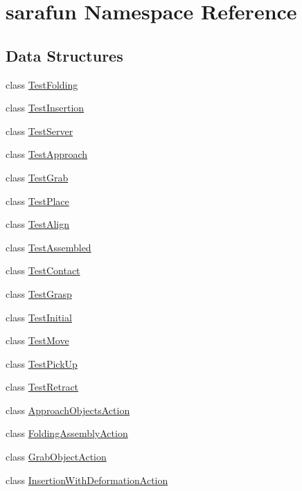 \hypertarget{namespacesarafun}{\section{sarafun Namespace Reference}
\label{namespacesarafun}
}
\subsection*{Data Structures}
\begin{DoxyCompactItemize}
\item 
class \hyperlink{classsarafun_1_1TestFolding}{Test\-Folding}
\item 
class \hyperlink{classsarafun_1_1TestInsertion}{Test\-Insertion}
\item 
class \hyperlink{classsarafun_1_1TestServer}{Test\-Server}
\item 
class \hyperlink{classsarafun_1_1TestApproach}{Test\-Approach}
\item 
class \hyperlink{classsarafun_1_1TestGrab}{Test\-Grab}
\item 
class \hyperlink{classsarafun_1_1TestPlace}{Test\-Place}
\item 
class \hyperlink{classsarafun_1_1TestAlign}{Test\-Align}
\item 
class \hyperlink{classsarafun_1_1TestAssembled}{Test\-Assembled}
\item 
class \hyperlink{classsarafun_1_1TestContact}{Test\-Contact}
\item 
class \hyperlink{classsarafun_1_1TestGrasp}{Test\-Grasp}
\item 
class \hyperlink{classsarafun_1_1TestInitial}{Test\-Initial}
\item 
class \hyperlink{classsarafun_1_1TestMove}{Test\-Move}
\item 
class \hyperlink{classsarafun_1_1TestPickUp}{Test\-Pick\-Up}
\item 
class \hyperlink{classsarafun_1_1TestRetract}{Test\-Retract}
\item 
class \hyperlink{classsarafun_1_1ApproachObjectsAction}{Approach\-Objects\-Action}
\item 
class \hyperlink{classsarafun_1_1FoldingAssemblyAction}{Folding\-Assembly\-Action}
\item 
class \hyperlink{classsarafun_1_1GrabObjectAction}{Grab\-Object\-Action}
\item 
class \hyperlink{classsarafun_1_1InsertionWithDeformationAction}{Insertion\-With\-Deformation\-Action}
\item 

\end{DoxyCompactItemize}
